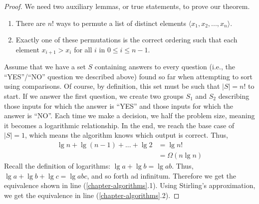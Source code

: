 \begin{proof}
We need two auxiliary lemmas, or true statements, to prove our theorem.
\begin{enumerate}[label=(\alph*)]
  \item There are $n!$ ways to permute a list of distinct elements $\langle{x_1, x_2, ..., x_n}\rangle$. \item Exactly one of these permutations is the correct ordering such that each element $x_{i+1} > x_{i}$ for all $i$ in $0 \leq i \leq n-1$. 
\end{enumerate}

Assume that we have a set $S$ containing answers to every question (i.e., the ``YES''/``NO'' question we described above) found so far when attempting to sort using comparisons. Of course, by definition, this set must be such that $|S|=n!$ to start. If we answer the first question, we create two groups $S_1$ and $S_2$ describing those inputs for which the answer is ``YES'' and those inputs for which the answer is ``NO''. Each time we make a decision, we half the problem size, meaning it becomes a logarithmic relationship. In the end, we reach the base case of $|S|=1$, which means the algorithm knows which output is correct. Thus,
\begin{align}
\lg{n} + \lg{(n-1)} + ... + \lg{2} &= \lg{n!}\\
        &= \Omega(n \lg n)
\end{align}
Recall the definition of logarithms: $\lg{a} + \lg{b} = \lg{ab}$. Thus, $\lg{a} + \lg{b} + \lg{c} = \lg{abc}$, and so forth ad infinitum. Therefore we get the equivalence shown in line (\ref{chapter-algorithms}.1). Using Stirling's approximation, we get the equivalence in line (\ref{chapter-algorithms}.2).
\end{proof}
